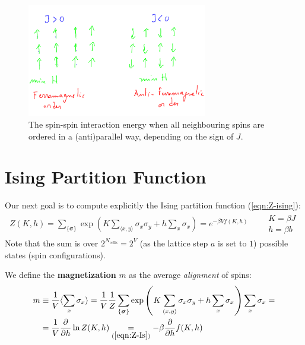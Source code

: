 \documentclass[../template.tex]{subfiles}
\begin{document}
\begin{figure}[H]
    \centering
    \includegraphics[width=0.7\textwidth]{image013.png} 
    \caption{The spin-spin interaction energy when all neighbouring spins are ordered in a (anti)parallel way, depending on the sign of $J$.\label{fig:orders}}
\end{figure}

\section{Ising Partition Function}
Our next goal is to compute explicitly the Ising partition function (\ref{eqn:Z-ising}):
\begin{align}\label{eqn:Z-Is}
    Z(K,h) = \sum_{\{\bm{\sigma}\}} \exp\left(K \sum_{\langle x,y \rangle} \sigma_x \sigma_y + h \sum_x \sigma_x\right) = e^{-\beta V f(K,h)} \qquad \substack{K = \beta J\\h = \beta b}
\end{align}
Note that the sum is over $2^{N_{\mathrm{cells}}} = 2^V$ (as the lattice step $a$ is set to $1$) possible states (spin configurations).

\medskip

We define the \textbf{magnetization} $m$ as the average \textit{alignment} of spins:
\begin{align} \nonumber
    m &\equiv \frac{1}{V} \langle \sum_x \sigma_x \rangle =  \frac{1}{V} \frac{1}{Z} \sum_{\{\bm{\sigma}\}} \exp\left(K \sum_{\langle x,y \rangle} \sigma_x \sigma_y + h \sum_x \sigma_x\right) \sum_x \sigma_x =\\
    &= \frac{1}{V} \pdv{h} \ln Z(K, h) \underset{(\ref{eqn:Z-Is})}{=}  - \beta \pdv{h} f(K,h)  \label{eqn:magnetization}
\end{align}  
\end{document}

